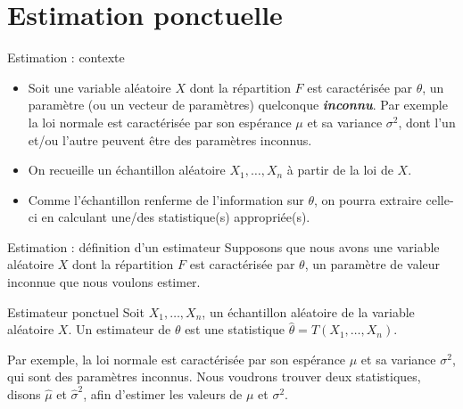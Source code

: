 \documentclass{BeamerTemplate}
\begin{document}
\section{Estimation ponctuelle}


\begin{frame}[t]{Estimation : contexte}

\begin{itemize}
 \item<1-> Soit une variable aléatoire $X$ dont la répartition $F$ est caractérisée par $\theta$, un paramètre (ou un vecteur de paramètres) quelconque \textit{\textbf{inconnu}}. Par exemple la loi normale est caractérisée par son espérance $\mu$ et sa variance $\sigma^2$, dont l'un et/ou l'autre peuvent être des paramètres inconnus.

\item<2-> On recueille un échantillon aléatoire $X_1,\dots,X_n$ à partir de la loi de $X$.

\item<3-> Comme l'échantillon renferme de l'information sur $\theta$, on pourra extraire celle-ci en calculant une/des statistique(s) appropriée(s).
\end{itemize}
\end{frame}

\begin{frame}[t]{Estimation : définition d'un estimateur}
    Supposons que nous avons une variable aléatoire $X$ dont la répartition $F$ est caractérisée par $\theta$, un paramètre de valeur inconnue que nous voulons estimer.

    \begin{Boite}{Estimateur ponctuel}
        Soit $X_1,\hdots,X_n$, un échantillon aléatoire de la variable aléatoire $X$. Un estimateur de $\theta$ est une statistique $\hat{\theta}=T(X_1,\hdots,X_n)$.
    \end{Boite}
    
    \vfill
    Par exemple, la loi normale est caractérisée par son espérance $\mu$ et sa variance $\sigma^2$, qui sont des paramètres inconnus. Nous voudrons trouver deux statistiques, disons $\widehat{\mu}$ et $\widehat{\sigma}^2$, afin d'estimer les valeurs de $\mu$ et $\sigma^2$.
\end{frame}
\end{document}
